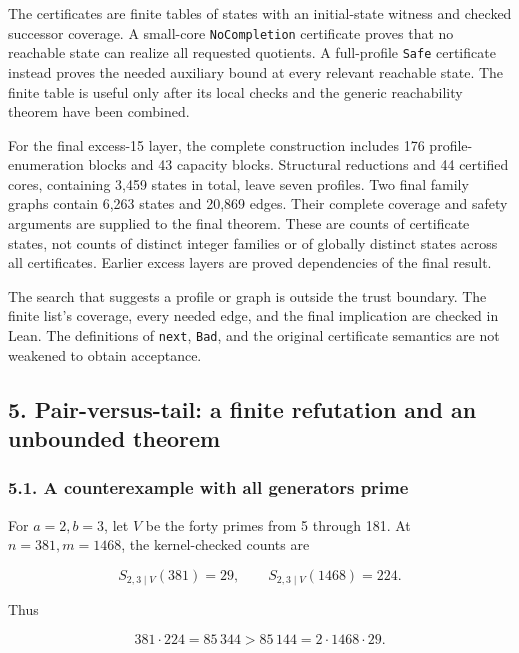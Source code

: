 \documentclass[
  11pt,
]{article}
\begin{document}
The certificates are finite tables of states with an initial-state
witness and checked successor coverage. A small-core
\texttt{NoCompletion} certificate proves that no reachable state can
realize all requested quotients. A full-profile \texttt{Safe}
certificate instead proves the needed auxiliary bound at every relevant
reachable state. The finite table is useful only after its local checks
and the generic reachability theorem have been combined.

For the final excess-15 layer, the complete construction includes 176
profile-enumeration blocks and 43 capacity blocks. Structural reductions
and 44 certified cores, containing 3,459 states in total, leave seven
profiles. Two final family graphs contain 6,263 states and 20,869 edges.
Their complete coverage and safety arguments are supplied to the final
theorem. These are counts of certificate states, not counts of distinct
integer families or of globally distinct states across all certificates.
Earlier excess layers are proved dependencies of the final result.

The search that suggests a profile or graph is outside the trust
boundary. The finite list's coverage, every needed edge, and the final
implication are checked in Lean. The definitions of \texttt{next},
\texttt{Bad}, and the original certificate semantics are not weakened to
obtain acceptance.

\hypertarget{pair-versus-tail-a-finite-refutation-and-an-unbounded-theorem}{%
\subsection{5. Pair-versus-tail: a finite refutation and an unbounded
theorem}\label{pair-versus-tail-a-finite-refutation-and-an-unbounded-theorem}}

\hypertarget{a-counterexample-with-all-generators-prime}{%
\subsubsection{5.1. A counterexample with all generators
prime}\label{a-counterexample-with-all-generators-prime}}

For \(a=2,b=3\), let \(V\) be the forty primes from 5 through 181. At
\(n=381,m=1468\), the kernel-checked counts are

\[
S_{2,3\mid V}(381)=29,\qquad S_{2,3\mid V}(1468)=224.
\]

Thus

\[
381\cdot224=85\,344>85\,144=2\cdot1468\cdot29.
\]
\end{document}
